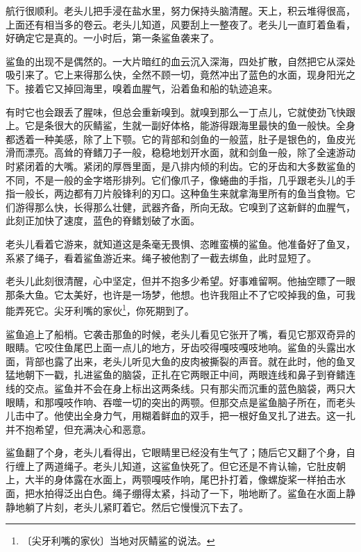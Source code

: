 \documentclass[12pt,UTF-8,openany]{ctexbook}
\begin{document}
\begin{normalsize}
    
    航行很顺利。老头儿把手浸在盐水里，努力保持头脑清醒。天上，积云堆得很高，上面还有相当多的卷云。老头儿知道，风要刮上一整夜了。老头儿一直盯着鱼看，好确定它是真的。一小时后，第一条鲨鱼袭来了。
    
    鲨鱼的出现不是偶然的。一大片暗红的血云沉入深海，四处扩散，自然把它从深处吸引来了。它上来得那么快，全然不顾一切，竟然冲出了蓝色的水面，现身阳光之下。接着它又掉回海里，嗅着血腥气，沿着鱼和船的轨迹追来。
    
    有时它也会跟丢了腥味，但总会重新嗅到。就嗅到那么一丁点儿，它就使劲飞快跟上。它是条很大的灰鲭鲨，生就一副好体格，能游得跟海里最快的鱼一般快。全身都透着一种美感，除了上下颚。它的背部和剑鱼的一般蓝，肚子是银色的，鱼皮光滑而漂亮。高耸的脊鳍刀子一般，稳稳地划开水面，就和剑鱼一般，除了全速游动时紧闭着的大嘴。紧闭的厚唇里面，是八排内倾的利齿。它的牙齿和大多数鲨鱼的不同，不是一般的金字塔形排列。它们像爪子，像蜷曲的手指，几乎跟老头儿的手指一般长，两边都有刀片般锋利的刃口。这种鱼生来就拿海里所有的鱼当食物。它们游得那么快，长得那么壮健，武器齐备，所向无敌。它嗅到了这新鲜的血腥气，此刻正加快了速度，蓝色的脊鳍划破了水面。
    
    老头儿看着它游来，就知道这是条毫无畏惧、恣睢蛮横的鲨鱼。他准备好了鱼叉，系紧了绳子，看着鲨鱼游近来。绳子被他割了一截去绑鱼，此时显短了。
    
    老头儿此刻很清醒，心中坚定，但并不抱多少希望。好事难留啊。他抽空瞟了一眼那条大鱼。它太美好，也许是一场梦，他想。也许我阻止不了它咬掉我的鱼，可我能弄死它。尖牙利嘴的家伙\footnote{〔尖牙利嘴的家伙〕当地对灰鲭鲨的说法。}，你死期到了。
    
    鲨鱼追上了船梢。它袭击那鱼的时候，老头儿看见它张开了嘴，看见它那双奇异的眼睛。它咬住鱼尾巴上面一点儿的地方，牙齿咬得嘎吱嘎吱地响。鲨鱼的头露出水面，背部也露了出来，老头儿听见大鱼的皮肉被撕裂的声音。就在此时，他的鱼叉猛地朝下一戳，扎进鲨鱼的脑袋，正扎在它两眼正中间，两眼连线和鼻子到脊鳍连线的交点。鲨鱼并不会在身上标出这两条线。只有那尖而沉重的蓝色脑袋，两只大眼睛，和那嘎吱作响、吞噬一切的突出的两颚。但那交点是鲨鱼脑子所在，而老头儿击中了。他使出全身力气，用糊着鲜血的双手，把一根好鱼叉扎了进去。这一扎并不抱希望，但充满决心和恶意。
    
    鲨鱼翻了个身，老头儿看得出，它眼睛里已经没有生气了；随后它又翻了个身，自行缠上了两道绳子。老头儿知道，这鲨鱼快死了。但它还是不肯认输，它肚皮朝上，大半的身体露在水面上，两颚嘎吱作响，尾巴扑打着，像螺旋桨一样拍击水面，把水拍得泛出白色。绳子绷得太紧，抖动了一下，啪地断了。鲨鱼在水面上静静地躺了片刻，老头儿紧盯着它。然后它慢慢沉下去了。
    

\end{normalsize}
\end{document}
